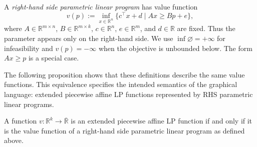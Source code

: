 \begin{definition}
A \emph{right-hand side parametric linear program} has value function
\[
v(p) := \inf_{x \in \mathbb{R}^n}
\{ c^\top x+d \mid Ax \ge Bp+e \},
\]
where $A \in \mathbb{R}^{m\times n}$, $B \in \mathbb{R}^{m\times k}$,
$c \in \mathbb{R}^n$, $e \in \mathbb{R}^m$, and $d \in \mathbb{R}$
are fixed. Thus the parameter appears only on the right-hand side.
We use $\inf\varnothing=+\infty$ for infeasibility and $v(p)=-\infty$
when the objective is unbounded below. The form $Ax\ge p$ is a special case.
\end{definition}

The following proposition shows that these definitions describe the same value
functions. This equivalence specifies the intended semantics of the graphical
language: extended piecewise affine LP functions represented by RHS parametric
linear programs.
\begin{proposition}
A function $v : \mathbb{R}^k \to \overline{\mathbb{R}}$ is an
extended piecewise affine LP function if and only if it is the value
function of a right-hand side parametric linear program as defined above.
\end{proposition}

